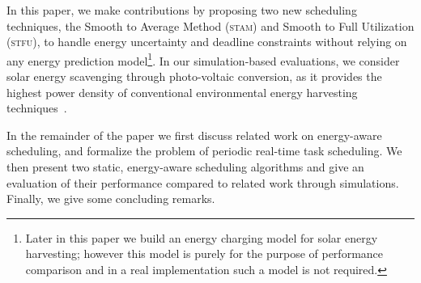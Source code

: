 In this paper, we make contributions by proposing two new scheduling techniques, the Smooth to Average Method (\textsc{stam}) and Smooth to Full Utilization (\textsc{stfu}), to handle energy uncertainty and deadline constraints without relying on any energy prediction model\footnote{Later in this paper we build an energy charging model for solar energy harvesting; however this model is purely for the purpose of performance comparison and in a real implementation such a model is not required.}.
In our simulation-based evaluations, we consider solar energy scavenging through photo-voltaic conversion, as it provides the highest power density of conventional environmental energy harvesting techniques~\cite{raghunathan2005design}. 

In the remainder of the paper we first discuss related work on energy-aware scheduling, 
and formalize the problem of periodic real-time task scheduling. 
We then present two static, energy-aware scheduling algorithms and give
an evaluation of their performance compared to related work through simulations. 
Finally, we give some concluding remarks. 

